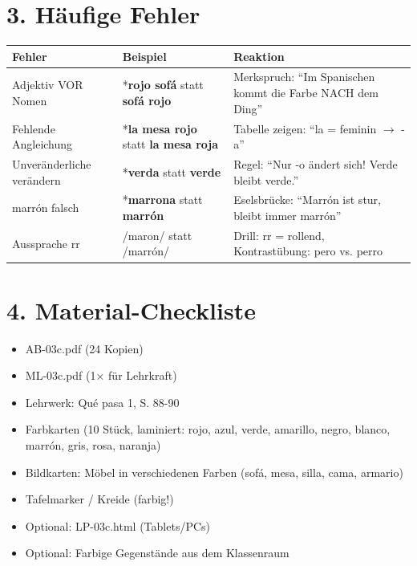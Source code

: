 \documentclass[11pt, a4paper]{article}
\newcommand{\fachfarbe}{spanisch}
\newcommand{\sequenz}{03}
\newcommand{\block}{c}
\newcommand{\lerngruppengroesse}{24}
\newcommand{\es}[1]{\textcolor{\fachfarbe}{\textbf{#1}}}
\begin{document}
\section*{3. Häufige Fehler}

\begin{fehlerbox}
\begin{tabularx}{\textwidth}{|l|X|X|}
\hline
\textbf{Fehler} & \textbf{Beispiel} & \textbf{Reaktion} \\
\hline
Adjektiv VOR Nomen & *\es{rojo sofá} statt \es{sofá rojo} & Merkspruch: ``Im Spanischen kommt die Farbe NACH dem Ding'' \\
\hline
Fehlende Angleichung & *\es{la mesa rojo} statt \es{la mesa roja} & Tabelle zeigen: ``la = feminin $\rightarrow$ -a'' \\
\hline
Unveränderliche verändern & *\es{verda} statt \es{verde} & Regel: ``Nur -o ändert sich! Verde bleibt verde.'' \\
\hline
marrón falsch & *\es{marrona} statt \es{marrón} & Eselsbrücke: ``Marrón ist stur, bleibt immer marrón'' \\
\hline
Aussprache rr & /maron/ statt /marrón/ & Drill: rr = rollend, Kontrastübung: pero vs. perro \\
\hline
\end{tabularx}
\end{fehlerbox}


\section*{4. Material-Checkliste}

\begin{materialbox}
\begin{itemize}[label=$\square$]
    \item AB-\sequenz\block.pdf (\lerngruppengroesse{} Kopien)
    \item ML-\sequenz\block.pdf (1× für Lehrkraft)
    \item Lehrwerk: Qué pasa 1, S. 88-90
    \item Farbkarten (10 Stück, laminiert: rojo, azul, verde, amarillo, negro, blanco, marrón, gris, rosa, naranja)
    \item Bildkarten: Möbel in verschiedenen Farben (sofá, mesa, silla, cama, armario)
    \item Tafelmarker / Kreide (farbig!)
    \item Optional: LP-\sequenz\block.html (Tablets/PCs)
    \item Optional: Farbige Gegenstände aus dem Klassenraum
\end{itemize}
\end{materialbox}
\end{document}
